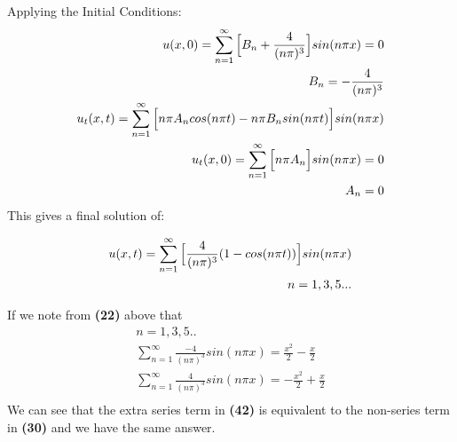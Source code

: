 \documentclass{article}
\begin{document}
Applying the Initial Conditions:
\begin{equation}
\begin{aligned}
u(x,0) = \sum_{n=1}^{\infty} \Big{[}B_n + \frac{4}{(n\pi)^3}\Big{]}sin(n\pi x) = 0\\
B_n = -\frac{4}{(n\pi)^3}\\
u_t(x,t) = \sum_{n=1}^{\infty} \Big{[} n\pi A_n cos(n\pi t) - n\pi B_n sin(n\pi t) \Big{]}sin(n\pi x)\\
u_t(x,0) = \sum_{n=1}^{\infty}\Big{[}n\pi A_n \Big{]}sin(n\pi x) = 0\\
A_n = 0
\end{aligned}
\end{equation}
This gives a final solution of:
\begin{tcolorbox}[minipage,colback=white,arc=0pt,outer arc=0pt]
\begin{equation}
\begin{aligned}
u(x,t) = \sum_{n=1}^{\infty} \Big{[} \frac{4}{(n\pi)^3}( 1- cos(n\pi t)) \Big{]}sin(n\pi x)\\
n = 1,3,5...
\end{aligned}
\end{equation}
\end{tcolorbox}
If we note from \textbf{(22)} above that 
\begin{equation}
\begin{aligned}
n = 1,3,5..\\
\sum_{n=1}^{\infty}\frac{-4}{(n\pi)^3}sin(n\pi x) = \frac{x^2}{2} - \frac{x}{2}\\
\sum_{n=1}^{\infty}\frac{4}{(n\pi)^3}sin(n\pi x) = -\frac{x^2}{2} +\frac{x}{2}\\
\end{aligned}
\end{equation}
We can see that the extra series term in \textbf{(42)} is equivalent to the non-series term in \textbf{(30)} and we have the same answer.
\end{document}
